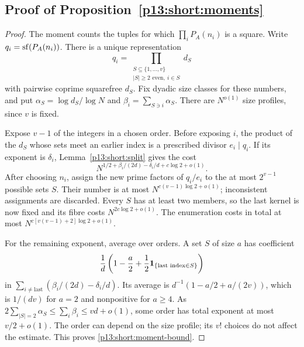 \subsection{Proof of Proposition~\ref{p13:short:moments}}
\label{p14:comp:short:moments}

\begin{proof}
The moment counts the tuples for which
\(\prod_iP_A(n_i)\) is a square. Write \(q_i=\sf(P_A(n_i))\).
There is a unique representation
\[
 q_i=\prod_{\substack{S\subseteq\{1,\ldots,v\}\\
                  |S|\ge2\text{ even},\ i\in S}}d_S
\]
with pairwise coprime squarefree \(d_S\). Fix dyadic size
classes for these numbers, and put
\(\alpha_S=\log d_S/\log N\) and
\(\beta_i=\sum_{S\ni i}\alpha_S\).
There are \(N^{o(1)}\) size profiles, since \(v\) is fixed.

Expose \(v-1\) of the integers in a chosen order. Before
exposing \(i\), the product of the \(d_S\) whose sets meet
an earlier index is a prescribed divisor \(e_i\mid q_i\).
If its exponent is \(\delta_i\), Lemma~\ref{p13:short:split}
gives the cost
\[
 N^{1/2+\beta_i/(2d)-\delta_i/d+c\log2+o(1)}.
\]
After choosing \(n_i\), assign the new prime factors of
\(q_i/e_i\) to the at most \(2^{v-1}\) possible sets \(S\).
Their number is at most
\(N^{c(v-1)\log2+o(1)}\); inconsistent assignments are
discarded. Every \(S\) has at least two members, so the last
kernel is now fixed and its fibre costs
\(N^{2c\log2+o(1)}\). The enumeration costs in total at most
\(N^{c[v(v-1)+2]\log2+o(1)}\).

For the remaining exponent, average over orders. A set \(S\)
of size \(a\) has coefficient
\[
 \frac1d\left(1-\frac a2+
               \frac12\ind_{\{\text{last index}\in S\}}\right)
\]
in \(\sum_{i\ne\mathrm{last}}(\beta_i/(2d)-\delta_i/d)\).
Its average is \(d^{-1}(1-a/2+a/(2v))\), which is
\(1/(dv)\) for \(a=2\) and nonpositive for \(a\ge4\).
As \(2\sum_{|S|=2}\alpha_S\le\sum_i\beta_i\le vd+o(1)\),
some order has total exponent at most \(v/2+o(1)\).
The order can depend on the size profile; its \(v!\) choices
do not affect the estimate. This proves
\eqref{p13:short:moment-bound}.
\end{proof}
